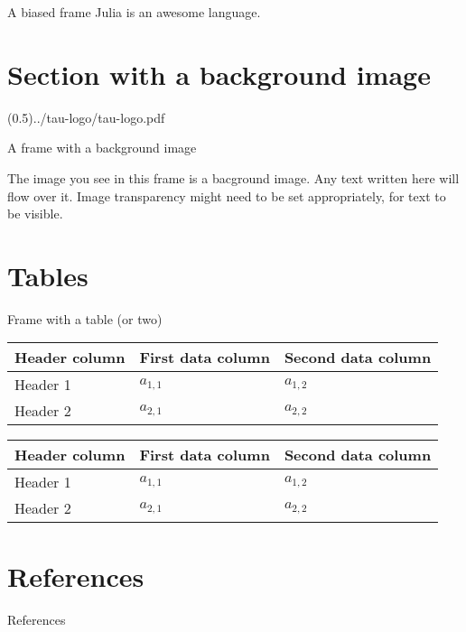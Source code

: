\begin{frame}{A biased frame}
    Julia is an awesome language.~\cite{Bezanson--Edelman--Karpinski-2017}
\end{frame}

\section{Section with a background image}

\begingroup

\setbackgroundimage[0.5](0.5){../tau-logo/tau-logo.pdf}

\begin{frame}{A frame with a background image}

	The image you see in this frame is a bacground image. Any text written
	here will flow over it. Image transparency might need to be set
	appropriately, for text to be visible.

\end{frame}

\endgroup

\section{Tables}

\begin{frame}{Frame with a table (or two)}

\begin{center}
\begin{tabular}{l | l l }
\toprule
Header column & First data column & Second data column \\
\midrule
Header 1 & \(a_{1,1}\) & \(a_{1,2}\) \\
Header 2 & \(a_{2,1}\) & \(a_{2,2}\) \\
\bottomrule
\end{tabular}
\end{center}

\begin{center}
\begin{tabular}{l | l l }
\toprule
Header column & First data column & Second data column \\
\midrule
Header 1 & \(a_{1,1}\) & \(a_{1,2}\) \\
Header 2 & \(a_{2,1}\) & \(a_{2,2}\) \\
\bottomrule
\end{tabular}
\end{center}
\end{frame}

\section{References}

\begin{frame}{References}
    \printbibliography[heading=none]
\end{frame}
